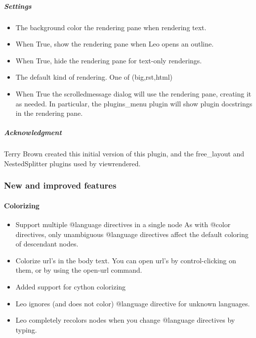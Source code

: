 \documentclass[a4paper,10pt,english]{sphinxmanual}
\begin{document}
\subparagraph{Settings}
\label{what-is-new:id2}\begin{itemize}
\item {} 
The background color the rendering pane when rendering text.

\item {} 
When True, show the rendering pane when Leo opens an outline.

\item {} 
When True, hide the rendering pane for text-only renderings.

\item {} 
The default kind of rendering.  One of (big,rst,html)

\item {} 
When True the scrolledmessage dialog will use the rendering pane,
creating it as needed.  In particular, the plugins\_menu plugin
will show plugin docstrings in the rendering pane.

\end{itemize}


\subparagraph{Acknowledgment}
\label{what-is-new:acknowledgment}
Terry Brown created this initial version of this plugin,
and the free\_layout and NestedSplitter plugins used by viewrendered.


\subsubsection{New and improved features}
\label{what-is-new:new-and-improved-features}

\paragraph{Colorizing}
\label{what-is-new:colorizing}\begin{itemize}
\item {} 
Support multiple @language directives in a single node
As with @color directives, only unambiguous @language directives affect the
default coloring of descendant nodes.

\item {} 
Colorize url's in the body text. You can open url's by control-clicking on
them, or by using the open-url command.

\item {} 
Added support for cython colorizing

\item {} 
Leo ignores (and does not color) @language directive for unknown languages.

\item {} 
Leo completely recolors nodes when you change @language directives by typing.

\end{itemize}
\end{document}
